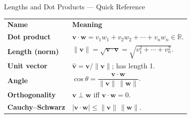 \begin{toolkitbox}{Lengths and Dot Products --- Quick Reference}
\begin{tabular}{@{}p{}p{}@{}}
\textbf{Name} & \textbf{Meaning} \\
\textbf{Dot product}     & $\mathbf{v} \cdot \mathbf{w} = v_1w_1 + v_2w_2 + \cdots + v_nw_n \in \mathbb{R}$. \\[4pt]
\textbf{Length (norm)}   & $\|\mathbf{v}\| = \sqrt{\mathbf{v} \cdot \mathbf{v}} = \sqrt{v_1^2 + \cdots + v_n^2}$. \\[4pt]
\textbf{Unit vector}     & $\hat{\mathbf{v}} = \mathbf{v}/\|\mathbf{v}\|$; has length 1. \\[4pt]
\textbf{Angle}           & $\cos\theta = \dfrac{\mathbf{v} \cdot \mathbf{w}}{\|\mathbf{v}\|\,\|\mathbf{w}\|}$. \\[6pt]
\textbf{Orthogonality}   & $\mathbf{v} \perp \mathbf{w}$ iff $\mathbf{v} \cdot \mathbf{w} = 0$. \\[4pt]
\textbf{Cauchy--Schwarz} & $|\mathbf{v} \cdot \mathbf{w}| \leq \|\mathbf{v}\|\,\|\mathbf{w}\|$. \\
\end{tabular}
\end{toolkitbox}





